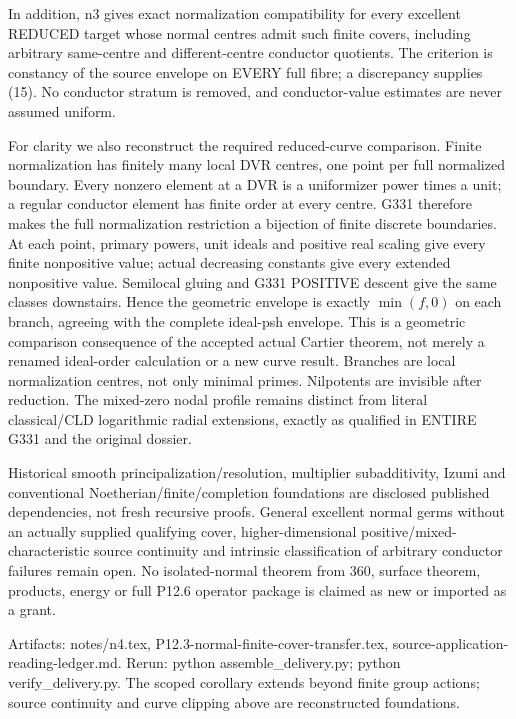 \documentclass[11pt]{article}
\begin{document}
In addition, n3 gives exact normalization compatibility for every
excellent REDUCED target whose normal centres admit such finite covers,
including arbitrary same-centre and different-centre conductor quotients.
The criterion is constancy of the source envelope on EVERY full fibre;
a discrepancy supplies (15). No conductor stratum is removed, and
conductor-value estimates are never assumed uniform.

For clarity we also reconstruct the required reduced-curve comparison.
Finite normalization has finitely many local DVR centres, one point per
full normalized boundary. Every nonzero element at a DVR is a
uniformizer power times a unit; a regular conductor element has finite
order at every centre. G331 therefore makes the full normalization
restriction a bijection of finite discrete boundaries. At each point,
primary powers, unit ideals and positive real scaling give every finite
nonpositive value; actual decreasing constants give every extended
nonpositive value. Semilocal gluing and G331 POSITIVE descent give
the same classes downstairs. Hence the geometric envelope is exactly
$\min(f,0)$ on each branch, agreeing with the complete ideal-psh envelope.
This is a geometric comparison consequence of the accepted actual
Cartier theorem, not merely a renamed ideal-order calculation or a new
curve result. Branches are local normalization centres, not only minimal
primes. Nilpotents are invisible after reduction. The mixed-zero nodal
profile remains distinct from literal classical/CLD logarithmic radial
extensions, exactly as qualified in ENTIRE G331 and the original dossier.

Historical smooth principalization/resolution, multiplier subadditivity,
Izumi and conventional Noetherian/finite/completion foundations are
disclosed published dependencies, not fresh recursive proofs. General
excellent normal germs without an actually supplied qualifying cover,
higher-dimensional positive/mixed-characteristic source continuity and
intrinsic classification of arbitrary conductor failures remain open.
No isolated-normal theorem from 360, surface theorem, products, energy
or full P12.6 operator package is claimed as new or imported as a grant.

Artifacts: notes/n4.tex, P12.3-normal-finite-cover-transfer.tex,
source-application-reading-ledger.md. Rerun:
python assemble\_delivery.py; python verify\_delivery.py.
The scoped corollary extends beyond finite group actions; source
continuity and curve clipping above are reconstructed foundations.
\end{document}
